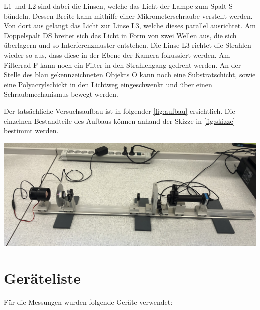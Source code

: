 \documentclass[11pt,ngerman]{scrartcl}
\begin{document}
\noindent L1 und L2 sind dabei die Linsen, welche das Licht der Lampe zum Spalt S bündeln. Dessen Breite kann mithilfe einer Mikrometerschraube verstellt werden. Von dort aus gelangt das Licht zur Linse L3, welche dieses parallel ausrichtet. Am Doppelspalt DS breitet sich das Licht in Form von zwei Wellen aus, die sich überlagern und so Interferenzmuster entstehen. Die Linse L3 richtet die Strahlen wieder so aus, dass diese in der Ebene der Kamera fokussiert werden. Am Filterrad F kann noch ein Filter in den Strahlengang gedreht werden. An der Stelle des blau gekennzeichneten Objekts O kann noch eine Substratschicht, sowie eine Polyacrylschickt in den Lichtweg eingeschwenkt und über einen Schraubmechanismus bewegt werden.

\noindent Der tatsächliche Versuchsaufbau ist in folgender \autoref{fig:aufbau} ersichtlich. Die einzelnen Bestandteile des Aufbaus können anhand der Skizze in \autoref{fig:skizze} bestimmt werden.

\begin{center}
	\begin{minipage}[t]{\textwidth}
		\centering
		\includegraphics[width=\textwidth]{aufbau}
		\label{fig:aufbau}
	\end{minipage}
\end{center}


\newpage

\section{Geräteliste}

\noindent Für die Messungen wurden folgende Geräte verwendet:
\end{document}
